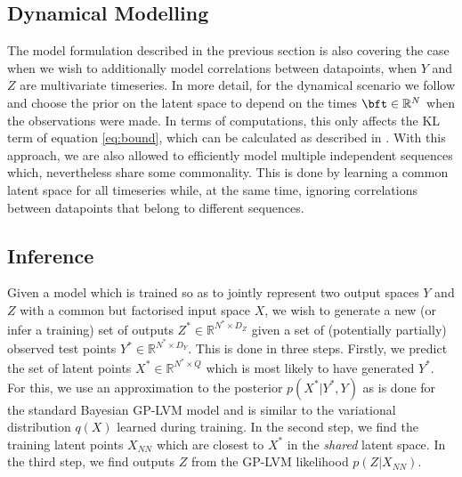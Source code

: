 

\subsection{Dynamical Modelling}

The model formulation described in the previous section is also covering the case
when we wish to additionally model correlations between datapoints, \ie when
$Y$ and $Z$ are multivariate timeseries. In more detail, for the dynamical scenario
we follow \cite{Damianou:vgpds11,Lawrence:hgplvm07} and choose the prior on the
 latent space to depend on the times 
$\bft \in \mathbb{R}^N$ when the observations were made. In terms of computations, this
 only affects the KL term of equation \eqref{eq:bound}, which can be calculated as described
 in \cite{Damianou:vgpds11}. With this approach, we are also allowed to 
 efficiently model multiple independent sequences which, nevertheless share some commonality. 
This is done by learning a common latent space for all timeseries while, at the same time, ignoring
correlations between datapoints that belong to different sequences.



\subsection{Inference \label{inference}}

Given a model which is trained so as to jointly represent two output spaces $Y$ and $Z$ with
a common but factorised input space $X$, we wish to generate a new (or infer a training) set of outputs
$Z^* \in \mathbb{R}^{N^* \times D_Z}$ given a set of (potentially partially) observed test points $Y^* \in \mathbb{R}^{N^* \times D_Y}$.
This is done in three steps. Firstly, we predict the set of latent points $X^* \in \mathbb{R}^{N^* \times Q}$
which is most likely to have generated $Y^*$. For this, we use an approximation to the posterior $p(X^*|Y^*,Y)$
as is done for the standard Bayesian GP-LVM model \cite{Titsias:bayesGPLVM10,Damianou:vgpds11} and is
similar to the variational distribution $q(X)$ learned during training.
In the second step, we find the training latent points $X_{NN}$ which are closest to $X^*$ in the \emph{shared}
latent space. 
In the third step, we find outputs $Z$ from the GP-LVM likelihood $p(Z | X_{NN})$.

